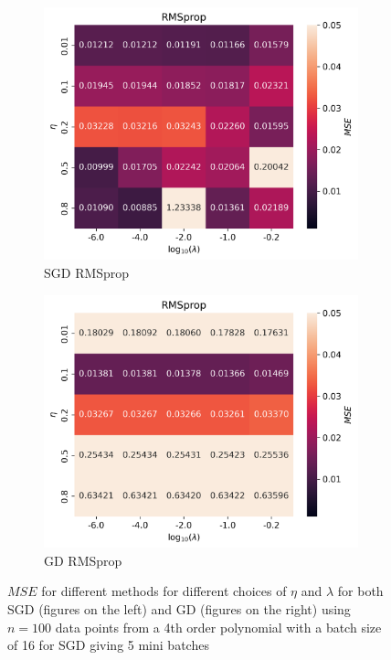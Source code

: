 \documentclass[11pt]{article}
\begin{document}
\begin{figure}[H]
  \begin{subfigure}{.5\textwidth}
    \centering
    \includegraphics[width=\textwidth]{../figures/RMSprop_SGD_eta_lmb.png}
    \caption{SGD RMSprop}
    \label{fig:}
  \end{subfigure}
  \begin{subfigure}{.5\textwidth}
    \centering
    \includegraphics[width=\textwidth]{../figures/RMSprop_GD_eta_lmb.png}
    \caption{GD RMSprop}
    \label{fig:}
  \end{subfigure}
  \caption{$MSE$ for different methods for different choices of $\eta$ and $\lambda$ for both SGD (figures on the left) and GD (figures on the right) using $n=100$ data points from a 4th order polynomial with a batch size of 16 for SGD giving 5 mini batches}
  \label{fig:compare_ridge}
\end{figure}
\end{document}
